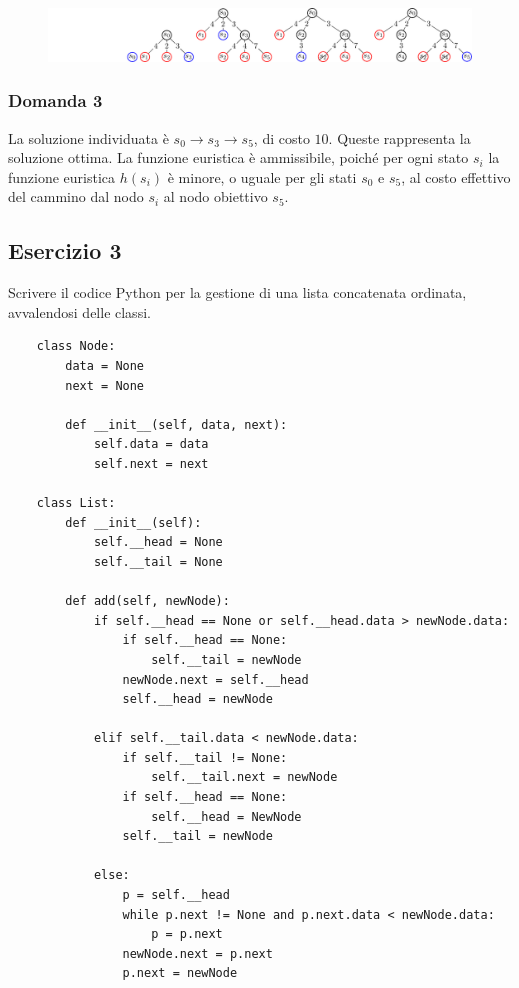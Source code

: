 \documentclass{article}
\numberwithin{equation}{section}
\begin{document}
\begin{figure}[H]%
    \centering
    \includegraphics[trim={3.9cm 0 0 0},scale=0.9]{albero_ricerca_25-11-24.pdf}%
\end{figure}

\subsubsection*{Domanda 3}

La soluzione individuata è $s_0\rightarrow s_3\rightarrow s_5$, di costo $10$. Queste rappresenta la soluzione ottima. La funzione euristica è ammissibile, poiché per ogni stato $s_i$ la funzione euristica $h(s_i)$ è minore, o uguale per gli stati $s_0$ e $s_5$, al costo effettivo del cammino dal nodo $s_i$ al nodo obiettivo $s_5$. 

\subsection{Esercizio 3}

Scrivere il codice Python per la gestione di una lista concatenata ordinata, avvalendosi delle classi. \\
\begin{verbatim}
    class Node:
        data = None
        next = None
        
        def __init__(self, data, next):
            self.data = data
            self.next = next

    class List:
        def __init__(self):
            self.__head = None
            self.__tail = None

        def add(self, newNode):            
            if self.__head == None or self.__head.data > newNode.data:
                if self.__head == None:
                    self.__tail = newNode
                newNode.next = self.__head
                self.__head = newNode

            elif self.__tail.data < newNode.data:
                if self.__tail != None:
                    self.__tail.next = newNode
                if self.__head == None:
                    self.__head = NewNode
                self.__tail = newNode

            else:            
                p = self.__head
                while p.next != None and p.next.data < newNode.data:
                    p = p.next
                newNode.next = p.next
                p.next = newNode
\end{verbatim}
\end{document}
